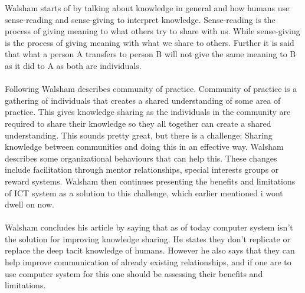 \documentclass[12pt]{article}
\begin{document}
Walsham starts of by talking about knowledge in general and how humans use sense-reading and sense-giving to interpret knowledge. Sense-reading is the process of giving meaning to what others try to share with us. While sense-giving is the process of giving meaning with what we share to others. Further it is said that what a person A transfers to person B will not give the same meaning to B as it did to A as both are individuals. 
\\\\
Following Walsham describes community of practice. Community of practice is a gathering of individuals that creates a shared understanding of some area of practice. This gives knowledge sharing as the individuals in the community are required to share their knowledge so they all together can create a shared understanding. This sounds pretty great, but there is a challenge: Sharing knowledge between communities and doing this in an effective way. Walsham describes some organizational behaviours that can help this. These changes include facilitation through mentor relationships, special interests groups or reward systems. Walsham then continues presenting the benefits and limitations of ICT system as a solution to this challenge, which earlier mentioned i wont dwell on now. 
\\\\
Walsham concludes his article by saying that as of today computer system isn't the solution for improving knowledge sharing. He states they don't replicate or replace the deep tacit knowledge of humans. However he also says that they can help improve communication of already existing relationships, and if one are to use computer system for this one should be assessing their benefits and limitations. 
\end{document}
